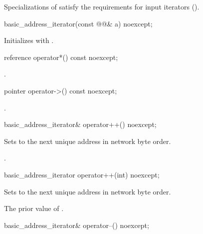 \pnum
Specializations of  satisfy the requirements for input iterators ().

\begin{itemdecl}
basic_address_iterator(const @@& a) noexcept;
\end{itemdecl}

\begin{itemdescr}
\pnum
\effects Initializes  with .
\end{itemdescr}

\begin{itemdecl}
reference operator*() const noexcept;
\end{itemdecl}

\begin{itemdescr}
\pnum
\returns {}.
\end{itemdescr}

\begin{itemdecl}
pointer operator->() const noexcept;
\end{itemdecl}

\begin{itemdescr}
\pnum
\returns {}.
\end{itemdescr}

\begin{itemdecl}
basic_address_iterator& operator++() noexcept;
\end{itemdecl}

\begin{itemdescr}
\pnum
\effects Sets  to the next unique address in network byte order.

\pnum
\returns {}.
\end{itemdescr}

\begin{itemdecl}
basic_address_iterator operator++(int) noexcept;
\end{itemdecl}

\begin{itemdescr}
\pnum
\effects Sets  to the next unique address in network byte order.

\pnum
\returns The prior value of .
\end{itemdescr}

\begin{itemdecl}
basic_address_iterator& operator--() noexcept;
\end{itemdecl}

